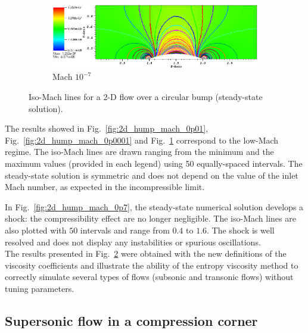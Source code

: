 \documentclass[preprint,10pt]{elsarticle}
\newcommand{\fig}[1]{Fig.~\ref{#1}}                      %
\begin{document}
\begin{figure}[H]
        \begin{subfigure}[b]{0.495\textwidth}
                \centering
                \includegraphics[width=\textwidth]{Hump2D_mach_1em7.png}
                \caption{Mach $10^{-7}$}
                \label{fig:2d_hump_mach_0p0000001}
        \end{subfigure}
        \caption{Iso-Mach lines for a 2-D flow over a circular bump (steady-state solution).}
				\label{fig:2d_hump}
\end{figure}
%
The results showed in \fig{fig:2d_hump_mach_0p01}, \fig{fig:2d_hump_mach_0p0001} and \fig{fig:2d_hump_mach_0p0000001} correspond to the low-Mach regime. The iso-Mach lines are drawn ranging from the minimum and the maximum values (provided in each legend) using 50 equally-spaced intervals. The steady-state solution is symmetric and does not depend on the value of the inlet Mach number, as expected in the incompressible limit. 

In \fig{fig:2d_hump_mach_0p7}, the steady-state numerical solution develops a shock: the compressibility effect are no longer negligible. The iso-Mach lines are also plotted with $50$ intervals and range from $0.4$ to $1.6$. The shock is well resolved and does not display any instabilities or spurious oscillations. \\
The results presented in \fig{fig:2d_hump} were obtained with the new definitions of the viscosity coefficients and illustrate the ability of the entropy viscosity method to correctly simulate several types of flows (subsonic and transonic flows) without tuning parameters.

\subsection{Supersonic flow in a compression corner} \label{sec:corner}
\end{document}
